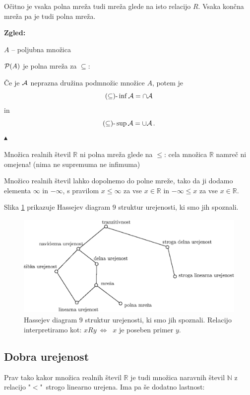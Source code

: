 \documentclass[11pt,paper=b5,footinclude,headinclude]{scrbook} %
\def\cee {{~\Leftrightarrow~}}
\def\zgled{\noindent\textbf{\color{blue} Zgled: }}
\def\kz{{\hfill{\color{blue}$\blacktriangle$}}}%
\begin{document}
Očitno je vsaka polna mreža tudi mreža glede na isto relacijo $R$. Vsaka končna mreža pa je tudi polna mreža.

\bigskip
\zgled

$A$ -- poljubna množica

${\cal P}(A)$ je polna mreža za $\subseteq$:

Če je ${\cal A}$ neprazna družina podmnožic množice $A$, potem je
$$(\subseteq)\textrm{-}\inf {\cal A} = \cap {\cal A}$$
in
$$(\subseteq)\textrm{-}\sup {\cal A} = \cup {\cal A}\,.$$\kz

\bigskip

Množica realnih števil $\mathbb{R}$ ni polna mreža glede na $\le$: cela množica $\mathbb{R}$ namreč ni omejena! (nima ne supremuma ne infimuma)

Množico realnih števil lahko dopolnemo do polne mreže, tako da ji dodamo elementa $\infty$ in $-\infty$, s pravilom $x\le \infty$ za vse $x\in \mathbb R$ in $-\infty\le x$ za vse $x\in \mathbb R$.

Slika \ref{fig:hasse9} prikazuje Hassejev diagram $9$ struktur urejenosti, ki smo jih spoznali. 

\begin{figure}
    \centering
    \includegraphics[height=50mm]{strukture3.eps}
    \caption{Hassejev diagram $9$ struktur urejenosti, ki smo jih spoznali. Relacijo interpretiramo kot: $xRy\cee$ $x$ je poseben primer $y$.}
    \label{fig:hasse9}
\end{figure}
\begin{center}

\end{center}





\subsection{Dobra urejenost}

Prav tako kakor množica realnih števil $\mathbb{R}$ je tudi množica naravnih števil $\mathbb{N}$
 z relacijo "$<$"~strogo linearno urejena.
Ima pa še dodatno lastnost:
\end{document}
